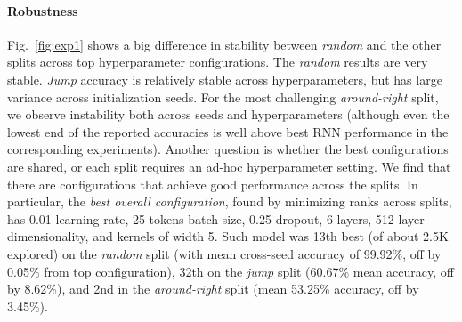 \paragraph{Robustness} Fig.~\ref{fig:exp1} shows a big difference in
stability between \emph{random} and the other splits across top
hyperparameter configurations. The \emph{random} results are very
stable. \emph{Jump} accuracy is relatively stable across
hyperparameters, but has large variance across initialization
seeds. For the most challenging \emph{around-right} split, we observe
instability both across seeds and hyperparameters (although even the
lowest end of the reported accuracies is well above best RNN
performance in the corresponding experiments). Another question is
whether the best configurations are shared, or each split requires an
ad-hoc hyperparameter setting. We find that there are configurations
that achieve good performance across the splits. In particular, the
\emph{best overall configuration}, found by minimizing ranks across
splits, has 0.01 learning rate, 25-tokens batch size, 0.25
dropout, 6 layers, 512 layer dimensionality, and kernels of width
5. Such model was 13th best (of about 2.5K explored) on the
\emph{random} split (with mean cross-seed accuracy of 99.92\%, off
by 0.05\% from top configuration), 32th on the \emph{jump} split
(60.67\% mean accuracy, off by 8.62\%), and 2nd in the
\emph{around-right} split (mean 53.25\% accuracy, off by 3.45\%).


